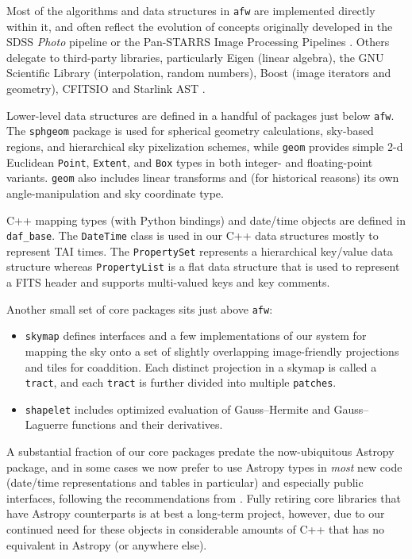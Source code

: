 Most of the algorithms and data structures in  \texttt{afw}  are implemented  directly within it, and often reflect the evolution of concepts originally developed in the SDSS \emph{Photo} pipeline \citep{2002AJ....123..485S} or the Pan-STARRS Image Processing Pipelines \citep{2020ApJS..251....3M}.
Others delegate to third-party libraries, particularly Eigen (linear algebra), the GNU Scientific Library (interpolation, random numbers), Boost (image iterators and geometry), CFITSIO \citep[image and table I/O;][]{2010ascl.soft10001P} and Starlink AST \citep[coordinate systems and transforms;][]{2016A&C....15...33B}.

Lower-level data structures are defined in a handful of packages just below \texttt{afw}.
The \texttt{sphgeom} package is used for spherical geometry calculations, sky-based regions, and hierarchical sky pixelization schemes, while \texttt{geom} provides simple 2-d Euclidean \texttt{Point}, \texttt{Extent}, and \texttt{Box} types in both integer- and floating-point variants.
\texttt{geom} also includes linear transforms and (for historical reasons) its own angle-manipulation and sky coordinate type.

C++ mapping types (with Python bindings) and date/time objects are defined in \texttt{daf\_base}.
The \texttt{DateTime} class is used in our C++ data structures mostly to represent TAI times.
The \texttt{PropertySet} represents a hierarchical key/value data structure whereas \texttt{PropertyList} is a flat data structure that is used to represent a FITS header and supports multi-valued keys and key comments.

Another small set of core packages sits just above \texttt{afw}:
\begin{itemize}
\item \texttt{skymap} defines interfaces and a few implementations of our system for mapping the sky onto a set of slightly overlapping image-friendly projections and tiles for coaddition.
Each distinct projection in a skymap is called a \texttt{tract}, and each \texttt{tract} is further divided into multiple \texttt{patches}.
\item \texttt{shapelet} includes optimized evaluation of Gauss--Hermite and Gauss--Laguerre functions and their derivatives.
\end{itemize}

A substantial fraction of our core packages predate the now-ubiquitous Astropy package, and in some cases we now prefer to use Astropy types in \emph{most} new code (date/time representations and tables in particular) and especially public interfaces, following the recommendations from \citet{2016SPIE.9913E..0GJ}.
Fully retiring core libraries that have Astropy counterparts is at best a long-term project, however, due to our continued need for these objects in considerable amounts of C++ that has no equivalent in Astropy (or anywhere else).
